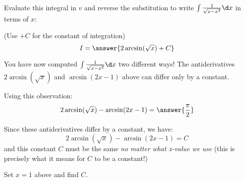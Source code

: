 \documentclass{ximera}
\begin{document}
\begin{exercise}
\begin{exercise}
\begin{exercise}
Evaluate this integral in $v$ and reverse the substitution to write $\int \frac{1}{\sqrt{x-x^2}} \d x$ in terms of $x$:

(Use $+C$ for the constant of integration)
\[
I = \answer{2\arcsin(\sqrt{x})+C}
\]

\end{exercise}
\end{exercise}

You have now computed $ \int \frac{1}{\sqrt{x-x^2}} \d x$ two different ways!  The antiderivatives $2\arcsin(\sqrt{x})$ and $\arcsin(2x-1)$ above can differ only by a constant.

Using this observation:
\[
2\arcsin(\sqrt{x})-\arcsin(2x-1) = \answer{\frac{\pi}{2}}
\] 

\begin{hint}
Since these antiderivatives differ by a constant, we have:
\[
2\arcsin(\sqrt{x})-\arcsin(2x-1) = C
\]
and this constant $C$ must be the same \emph{no matter what x-value we use} (this is precisely what it means for $C$ to be a constant!)

Set $x=1$ above and find $C$.

\end{hint}

\end{exercise}
\end{document}
